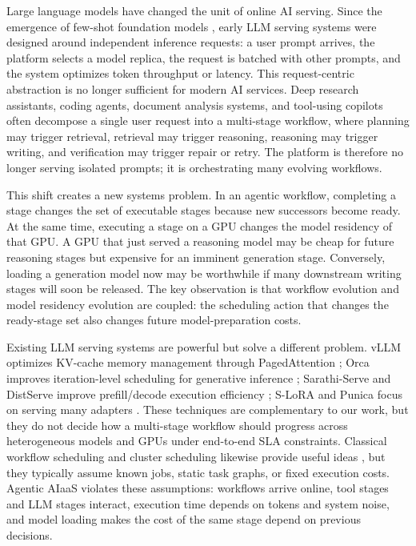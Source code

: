 \documentclass[10pt,conference]{IEEEtran}
\begin{document}
Large language models have changed the unit of online AI serving. Since the emergence of few-shot foundation models \cite{brown2020language,bommasani2021foundation}, early LLM serving systems were designed around independent inference requests: a user prompt arrives, the platform selects a model replica, the request is batched with other prompts, and the system optimizes token throughput or latency. This request-centric abstraction is no longer sufficient for modern AI services. Deep research assistants, coding agents, document analysis systems, and tool-using copilots often decompose a single user request into a multi-stage workflow, where planning may trigger retrieval, retrieval may trigger reasoning, reasoning may trigger writing, and verification may trigger repair or retry. The platform is therefore no longer serving isolated prompts; it is orchestrating many evolving workflows.

This shift creates a new systems problem. In an agentic workflow, completing a stage changes the set of executable stages because new successors become ready. At the same time, executing a stage on a GPU changes the model residency of that GPU. A GPU that just served a reasoning model may be cheap for future reasoning stages but expensive for an imminent generation stage. Conversely, loading a generation model now may be worthwhile if many downstream writing stages will soon be released. The key observation is that workflow evolution and model residency evolution are coupled: the scheduling action that changes the ready-stage set also changes future model-preparation costs.

Existing LLM serving systems are powerful but solve a different problem. vLLM optimizes KV-cache memory management through PagedAttention \cite{kwon2023vllm}; Orca improves iteration-level scheduling for generative inference \cite{yu2022orca}; Sarathi-Serve and DistServe improve prefill/decode execution efficiency \cite{agrawal2024sarathi,zhong2024distserve}; S-LoRA and Punica focus on serving many adapters \cite{sheng2023slora,chen2023punica}. These techniques are complementary to our work, but they do not decide how a multi-stage workflow should progress across heterogeneous models and GPUs under end-to-end SLA constraints. Classical workflow scheduling and cluster scheduling likewise provide useful ideas \cite{topcuoglu2002heft,gog2016firmament,mao2019decima,gu2019tiresias}, but they typically assume known jobs, static task graphs, or fixed execution costs. Agentic AIaaS violates these assumptions: workflows arrive online, tool stages and LLM stages interact, execution time depends on tokens and system noise, and model loading makes the cost of the same stage depend on previous decisions.
\end{document}
